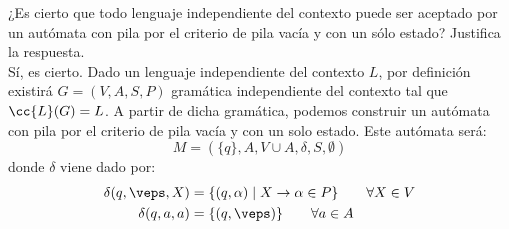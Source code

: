 \documentclass[12pt]{article}
\begin{document}
\begin{ejercicio}[1.25 puntos]
    ¿Es cierto que todo lenguaje independiente del contexto puede ser aceptado por un autómata con pila por el criterio de pila vacía y con un sólo estado? Justifica la respuesta.\\

    Sí, es cierto. Dado un lenguaje independiente del contexto $L$, por definición existirá $G=(V,A,S,P)$ gramática independiente del contexto tal que $\cc{L}(G)=L$. A partir de dicha gramática, podemos construir un autómata con pila por el criterio de pila vacía y con un solo estado. Este autómata será:
    \begin{equation*}
        M=(\{q\}, A, V\cup A, \delta, S, \emptyset)
    \end{equation*}
    donde $\delta$ viene dado por:
    \begin{align*}
        \delta(q,\veps,X) &= \{(q,\alpha)\mid X\rightarrow \alpha\in P\}\qquad \forall X\in V\\
        \delta(q,a,a) &= \{(q,\veps)\}\qquad \forall a\in A
    \end{align*}
\end{ejercicio}
\end{document}
